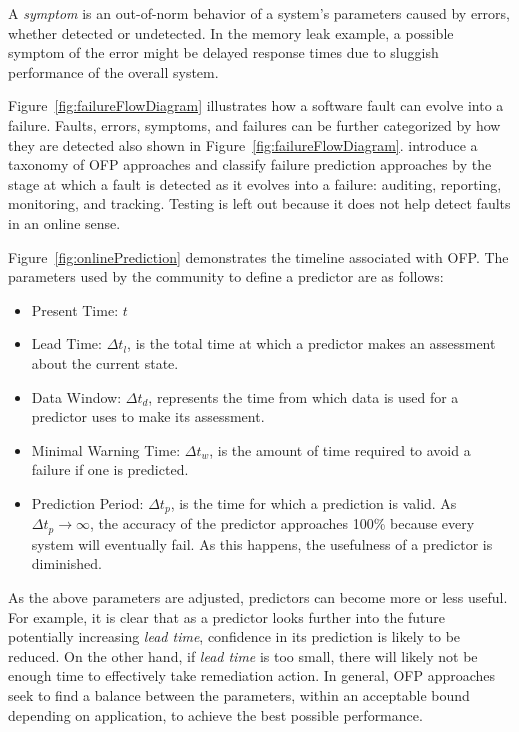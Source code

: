 A \emph{symptom} is an out-of-norm behavior of a system's parameters caused by
errors, whether detected or undetected.  In the memory leak example, a possible
symptom of the error might be delayed response times due to sluggish
performance of the overall system.


Figure~\ref{fig:failureFlowDiagram} illustrates how a software fault can evolve
into a failure.  Faults, errors, symptoms, and failures can be further
categorized by how they are detected also shown in
Figure~\ref{fig:failureFlowDiagram}.  \citet{salfnerSurvey} introduce a
taxonomy of \ac{OFP} approaches and classify failure prediction approaches by
the stage at which a fault is detected as it evolves into a failure: auditing,
reporting, monitoring, and tracking.  Testing is left out because it does not
help detect faults in an online sense.  


Figure~\ref{fig:onlinePrediction} demonstrates the timeline associated with
\ac{OFP}.  The parameters used by the community to define a predictor are as
follows:
\begin{itemize}
	\item{Present Time: $t$}
  \item{Lead Time: $\Delta t_{l}$, is the total time at which a predictor makes
  an assessment about the current state.}
  \item{Data Window: $\Delta t_{d}$, represents the time from which data is
  used for a predictor uses to make its assessment.}
  \item{Minimal Warning Time: $\Delta t_{w}$, is the amount of time required to
  avoid a failure if one is predicted.}
  \item{Prediction Period: $\Delta t_{p}$, is the time for which a prediction
  is valid.  As $\Delta t_{p} \rightarrow \infty$, the accuracy of the
  predictor approaches 100\% because every system will eventually fail.  As
  this happens, the usefulness of a predictor is diminished.}
\end{itemize}

As the above parameters are adjusted, predictors can become more or less
useful.  For example, it is clear that as a predictor looks further into the
future potentially increasing \emph{lead time}, confidence in its prediction is
likely to be reduced.  On the other hand, if \emph{lead time} is too small,
there will likely not be enough time to effectively take remediation action.
In general, \ac{OFP} approaches seek to find a balance between the parameters,
within an acceptable bound depending on application, to achieve the best
possible performance.

